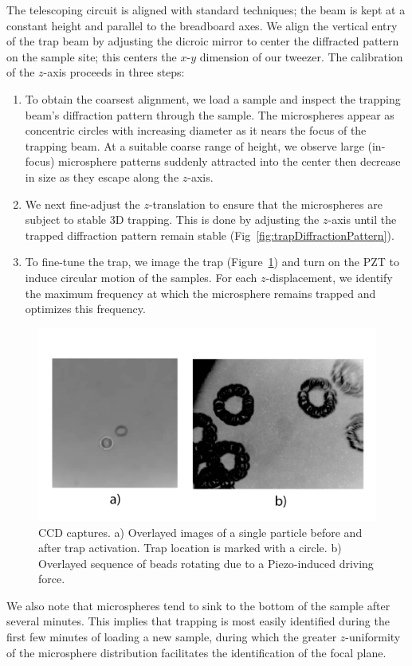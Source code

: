 \documentclass[aps,prb,twocolumn,superscriptaddress,floatfix,longbibliography,citeautoscript]{revtex4-2}
\begin{document}
The telescoping circuit is aligned with standard techniques; the beam is kept at a constant 
height and parallel to the breadboard axes. We align the vertical entry of the 
trap beam by adjusting the dicroic mirror to center the diffracted pattern on the sample site; 
this centers the $x$-$y$ dimension of our tweezer. 
The calibration of the $z$-axis proceeds in three steps: 
\begin{enumerate}
    \item To obtain the coarsest alignment, 
    we load a sample and inspect the trapping beam's diffraction 
    pattern through the sample. The microspheres appear as concentric circles with increasing diameter 
    as it nears the focus of the trapping beam. At a suitable coarse range of height, we observe large (in-focus) microsphere patterns suddenly attracted into the center then decrease in size as they escape along the $z$-axis. 
    \item We next fine-adjust the $z$-translation to ensure that the microspheres are subject to stable 3D trapping. 
    This is done by adjusting the $z$-axis until the trapped diffraction pattern remain stable (Fig~\ref{fig:trapDiffractionPattern}). 
    \item To fine-tune the trap, we image the trap (Figure~\ref{fig:trapCamera}) and turn on the PZT to induce circular motion of the samples. 
    For each $z$-displacement, we identify the maximum frequency at which the microsphere remains trapped and 
    optimizes this frequency. 
\end{enumerate}
\begin{figure} %
    \centering
    \includegraphics[width=1\linewidth]{Second_draft/figs/bw.png}
    \caption{CCD captures. a) Overlayed images of a single particle before and after trap activation. Trap location is marked with a circle. b) Overlayed sequence of beads rotating due to a Piezo-induced driving force.}
    \label{fig:trapCamera}
\end{figure}
We also note that microspheres tend to sink to the bottom of the sample after several minutes. This implies that trapping is most easily identified during the first few minutes of loading a new sample, during which the greater $z$-uniformity of the microsphere distribution facilitates the identification of the focal plane. 
\end{document}
